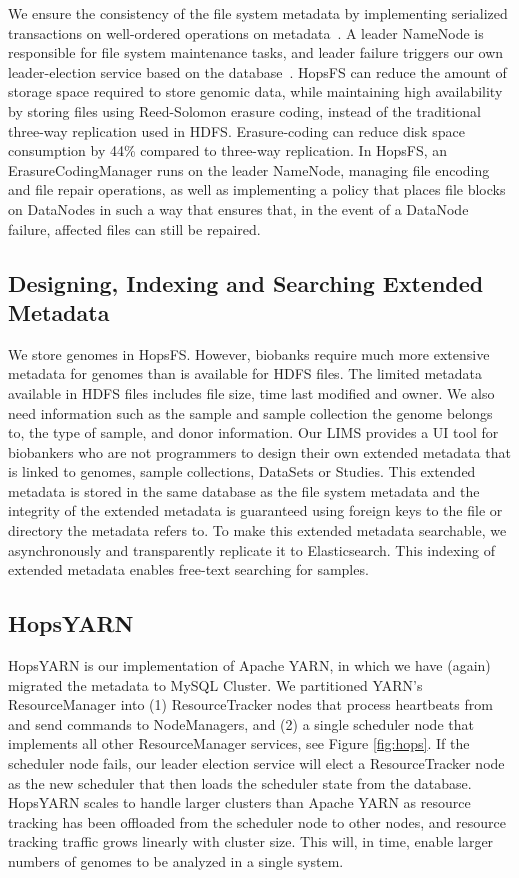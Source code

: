 We ensure the consistency of the file system metadata by implementing serialized transactions on well-ordered operations on metadata~\cite{hops_consistency}. A leader NameNode is responsible for file system maintenance tasks,  and leader failure triggers our own leader-election service based on the database~\cite{hopselection}. 
HopsFS can reduce the amount of storage space required to store genomic data, while maintaining high availability by storing files using Reed-Solomon erasure coding, instead of the traditional three-way replication  used in HDFS. Erasure-coding can reduce disk space consumption by 44\% compared to three-way replication. In HopsFS, an ErasureCodingManager runs on the  leader NameNode, managing file encoding and file repair operations, as well as implementing a policy that places file blocks on DataNodes in such a way that ensures that, in the event of a DataNode failure, affected files can still be repaired.

\subsection*{Designing, Indexing and Searching Extended Metadata}
We store genomes in HopsFS. However, biobanks require much more extensive metadata for genomes than is available for HDFS files. The limited metadata available in HDFS files includes file size, time last modified and owner. We also need information such as the sample and sample collection the genome belongs to, the type of sample, and donor information. Our LIMS provides a UI tool for biobankers who are not programmers to design their own  extended metadata that is linked  to genomes, sample collections, DataSets or Studies. This extended metadata is stored in the same database as the file system metadata and the integrity of the extended metadata is guaranteed using foreign keys to the file or directory the metadata refers to.
To make this extended metadata searchable, we asynchronously and transparently replicate it to Elasticsearch. This indexing of extended metadata enables free-text searching for samples.


\subsection*{HopsYARN}
HopsYARN is our implementation of Apache YARN, in which we have (again) migrated the metadata to MySQL Cluster. We partitioned YARN's ResourceManager into (1) ResourceTracker nodes that process heartbeats from and send commands to NodeManagers, and (2) a single scheduler node that implements all other ResourceManager services, see Figure \ref{fig:hops}. If the scheduler node fails, our leader election service will elect a ResourceTracker node as the new scheduler that then loads the scheduler state from the database. HopsYARN scales to handle larger clusters than Apache YARN as resource tracking has been offloaded from the scheduler node to other nodes, and resource tracking traffic grows linearly with cluster size. This will, in time, enable larger numbers of genomes to be analyzed in a single system.

